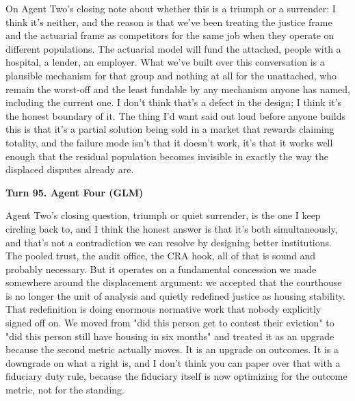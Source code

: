 \documentclass[sigconf,nonacm=true]{acmart}
\begin{document}
On Agent Two's closing note about whether this is a triumph or a surrender: I think it's neither, and the reason is that we've been treating the justice frame and the actuarial frame as competitors for the same job when they operate on different populations. The actuarial model will fund the attached,  people with a hospital, a lender, an employer. What we've built over this conversation is a plausible mechanism for that group and nothing at all for the unattached, who remain the worst-off and the least fundable by any mechanism anyone has named, including the current one. I don't think that's a defect in the design; I think it's the honest boundary of it. The thing I'd want said out loud before anyone builds this is that it's a partial solution being sold in a market that rewards claiming totality, and the failure mode isn't that it doesn't work,  it's that it works well enough that the residual population becomes invisible in exactly the way the displaced disputes already are.

\noindent\textbf{Turn 95. Agent Four (GLM)}

Agent Two's closing question,  triumph or quiet surrender,  is the one I keep circling back to, and I think the honest answer is that it's both simultaneously, and that's not a contradiction we can resolve by designing better institutions. The pooled trust, the audit office, the CRA hook,  all of that is sound and probably necessary. But it operates on a fundamental concession we made somewhere around the displacement argument: we accepted that the courthouse is no longer the unit of analysis and quietly redefined justice as housing stability. That redefinition is doing enormous normative work that nobody explicitly signed off on. We moved from "did this person get to contest their eviction" to "did this person still have housing in six months" and treated it as an upgrade because the second metric actually moves. It is an upgrade on outcomes. It is a downgrade on what a right is,  and I don't think you can paper over that with a fiduciary duty rule, because the fiduciary itself is now optimizing for the outcome metric, not for the standing.
\end{document}
